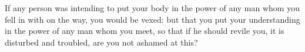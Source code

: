 If any person was  intending to put your body in the power  of any man whom you
fell  in  with  on  the  way,  you  would be  vexed:  but  that  you  put  your
understanding in  the power  of any  man whom you  meet, so  that if  he should
revile you, it is disturbed and troubled, are you not ashamed at this?
